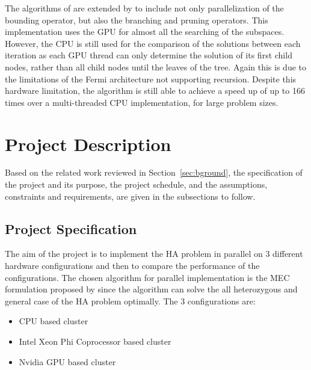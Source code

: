 \documentclass[10pt,twocolumn]{article}
\begin{document}
The algorithms of \cite{melab:2012, chakroun:2012} are extended by \cite{chakroun:2013} to 
include not only parallelization of the bounding operator, but also the branching and pruning operators. This
implementation uses the GPU for almost all the searching of the subspaces. However, the CPU is still used for the
comparison of the solutions between each iteration as each GPU thread can only determine the solution of its 
first child nodes, rather than all child nodes until the leaves of the tree. Again this is due to the limitations 
of the Fermi architecture not supporting recursion. Despite this hardware limitation, the algorithm is still able
to achieve a speed up of up to 166 times over a multi-threaded CPU implementation, for large problem sizes.


\section{Project Description} \label{sec:projdes}

Based on the related work reviewed in Section~\ref{sec:bground}, the specification of the project and its 
purpose, the project schedule, and the assumptions, constraints and requirements, are given in the 
subsections to follow.

\subsection{Project Specification} \label{sec:projspec}

The aim of the project is to implement the HA problem in parallel on 3 different hardware configurations and 
then to compare the performance of the configurations. The chosen algorithm for parallel implementation is 
the MEC formulation proposed by \cite{chen:2013} since the algorithm can solve the all heterozygous and 
general case of the HA problem optimally. The 3 configurations are:
\begin{itemize}[noitemsep]
    \item{CPU based cluster}
    \item{Intel Xeon Phi Coprocessor based cluster}
    \item{Nvidia GPU based cluster}
\end{itemize}
\end{document}
